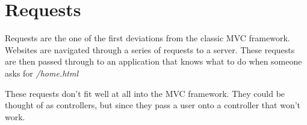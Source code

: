 \chapter{Requests}

Requests are the one of the first deviations from the classic MVC
framework. Websites are navigated through a series of requests to a
server. These requests are then passed through to an application that
knows what to do when someone asks for \emph{/home.html}

These requests don't fit well at all into the MVC framework. They could
be thought of as controllers, but since they pass a user onto a
controller that won't work.
